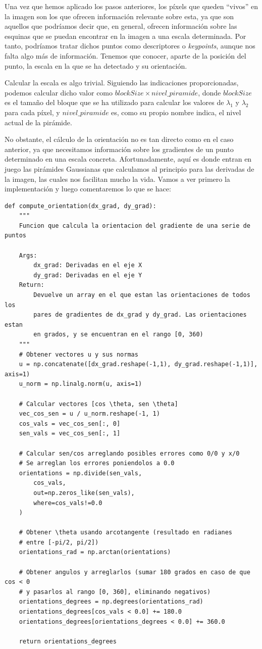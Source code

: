 \documentclass[11pt,a4paper]{article}
\begin{document}
Una vez que hemos aplicado los pasos anteriores, los píxels que queden ``vivos'' en la
imagen son los que ofrecen información relevante sobre esta, ya que son aquellos que podríamos
decir que, en general, ofrecen información sobre las esquinas que se puedan encontrar en la imagen
a una escala determinada. Por tanto, podríamos tratar dichos puntos como descriptores
o \textit{keypoints}, aunque nos falta algo más de información. Tenemos que conocer,
aparte de la posición del punto, la escala en la que se ha detectado y su orientación.

Calcular la escala es algo trivial. Siguiendo las indicaciones proporcionadas, podemos calcular dicho
valor como $blockSize \times nivel\_piramide$, donde $blockSize$ es el tamaño del bloque que se
ha utilizado para calcular los valores de $\lambda_1$ y $\lambda_2$ para cada píxel, y
$nivel\_piramide$ es, como su propio nombre indica, el nivel actual de la pirámide.

No obstante, el cálculo de la orientación no es tan directo como en el caso anterior, ya que necesitamos
información sobre los gradientes de un punto determinado en una escala concreta. Afortunadamente, aquí es
donde entran en juego las pirámides Gaussianas que calculamos al principio para las derivadas
de la imagen, las cuales nos facilitan mucho la vida. Vamos a ver primero la implementación
y luego comentaremos lo que se hace:

\begin{lstlisting}
def compute_orientation(dx_grad, dy_grad):
    """
    Funcion que calcula la orientacion del gradiente de una serie de puntos

    Args:
        dx_grad: Derivadas en el eje X
        dy_grad: Derivadas en el eje Y
    Return:
        Devuelve un array en el que estan las orientaciones de todos los
        pares de gradientes de dx_grad y dy_grad. Las orientaciones estan
        en grados, y se encuentran en el rango [0, 360)
    """
    # Obtener vectores u y sus normas
    u = np.concatenate([dx_grad.reshape(-1,1), dy_grad.reshape(-1,1)], axis=1)
    u_norm = np.linalg.norm(u, axis=1)

    # Calcular vectores [cos \theta, sen \theta]
    vec_cos_sen = u / u_norm.reshape(-1, 1)
    cos_vals = vec_cos_sen[:, 0]
    sen_vals = vec_cos_sen[:, 1]

    # Calcular sen/cos arreglando posibles errores como 0/0 y x/0
    # Se arreglan los errores poniendolos a 0.0
    orientations = np.divide(sen_vals,
        cos_vals,
        out=np.zeros_like(sen_vals),
        where=cos_vals!=0.0
    )

    # Obtener \theta usando arcotangente (resultado en radianes
    # entre [-pi/2, pi/2])
    orientations_rad = np.arctan(orientations)

    # Obtener angulos y arreglarlos (sumar 180 grados en caso de que cos < 0
    # y pasarlos al rango [0, 360], eliminando negativos)
    orientations_degrees = np.degrees(orientations_rad)
    orientations_degrees[cos_vals < 0.0] += 180.0
    orientations_degrees[orientations_degrees < 0.0] += 360.0
    
    return orientations_degrees
\end{lstlisting}
\end{document}
